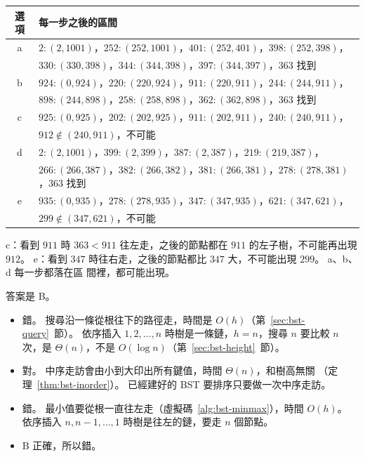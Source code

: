 \begin{center}
\small
\begin{tabular}{cl}
\toprule
選項 & 每一步之後的區間 \\
\midrule
a & $2{:}(2, 1001)$，$252{:}(252, 1001)$，$401{:}(252, 401)$，$398{:}(252, 398)$，\\
  & $330{:}(330, 398)$，$344{:}(344, 398)$，$397{:}(344, 397)$，$363$ 找到 \\
b & $924{:}(0, 924)$，$220{:}(220, 924)$，$911{:}(220, 911)$，$244{:}(244, 911)$，\\
  & $898{:}(244, 898)$，$258{:}(258, 898)$，$362{:}(362, 898)$，$363$ 找到 \\
c & $925{:}(0, 925)$，$202{:}(202, 925)$，$911{:}(202, 911)$，$240{:}(240, 911)$，\\
  & $912 \notin (240, 911)$，不可能 \\
d & $2{:}(2, 1001)$，$399{:}(2, 399)$，$387{:}(2, 387)$，$219{:}(219, 387)$，\\
  & $266{:}(266, 387)$，$382{:}(266, 382)$，$381{:}(266, 381)$，$278{:}(278, 381)$，$363$ 找到 \\
e & $935{:}(0, 935)$，$278{:}(278, 935)$，$347{:}(347, 935)$，$621{:}(347, 621)$，\\
  & $299 \notin (347, 621)$，不可能 \\
\bottomrule
\end{tabular}
\end{center}

c：看到 $911$ 時 $363 < 911$ 往左走，之後的節點都在 $911$ 的左子樹，不可能再出現 $912$。
e：看到 $347$ 時往右走，之後的節點都比 $347$ 大，不可能出現 $299$。 a、b、d 每一步都落在區
間裡，都可能出現。

答案是 B。
\begin{itemize}
\item[A.] 錯。 搜尋沿一條從根往下的路徑走，時間是 $O(h)$（第~\ref{sec:bst-query}~節）。 依序插入
$1, 2, \ldots, n$ 時樹是一條鏈，$h = n$，搜尋 $n$ 要比較 $n$ 次，是 $\Theta(n)$，不是
$O(\log n)$（第~\ref{sec:bst-height}~節）。
\item[B.] 對。 中序走訪會由小到大印出所有鍵值，時間 $\Theta(n)$，和樹高無關
（定理~\ref{thm:bst-inorder}）。 已經建好的 BST 要排序只要做一次中序走訪。
\item[C.] 錯。 最小值要從根一直往左走（虛擬碼~\ref{alg:bst-minmax}），時間 $O(h)$。 依序插入
$n, n - 1, \ldots, 1$ 時樹是往左的鏈，要走 $n$ 個節點。
\item[D.] B 正確，所以錯。
\end{itemize}

